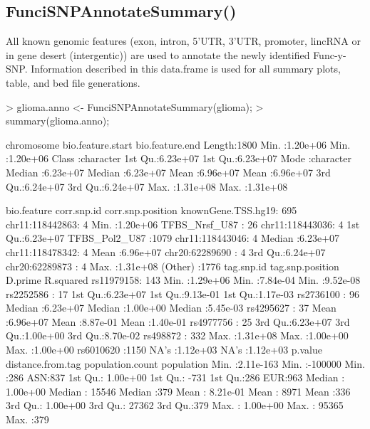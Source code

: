 \documentclass[a4paper]{article}
\begin{document}
\subsection*{FunciSNPAnnotateSummary()}
All known genomic features (exon, intron, 5'UTR, 3'UTR, promoter, lincRNA or in 
gene desert (intergentic)) are used to annotate the newly identified Func-y-SNP.
 Information described in this data.frame is used for all summary plots, table, 
 and bed file generations.
\begin{Schunk}
\begin{Sinput}
> glioma.anno <- FunciSNPAnnotateSummary(glioma);
> summary(glioma.anno);
\end{Sinput}
\begin{Soutput}
  chromosome        bio.feature.start  bio.feature.end   
 Length:1800        Min.   :1.20e+06   Min.   :1.20e+06  
 Class :character   1st Qu.:6.23e+07   1st Qu.:6.23e+07  
 Mode  :character   Median :6.23e+07   Median :6.23e+07  
                    Mean   :6.96e+07   Mean   :6.96e+07  
                    3rd Qu.:6.24e+07   3rd Qu.:6.24e+07  
                    Max.   :1.31e+08   Max.   :1.31e+08  
                                                         
             bio.feature            corr.snp.id   corr.snp.position 
 knownGene.TSS.hg19: 695   chr11:118442863:   4   Min.   :1.20e+06  
 TFBS_Nrsf_U87     :  26   chr11:118443036:   4   1st Qu.:6.23e+07  
 TFBS_Pol2_U87     :1079   chr11:118443046:   4   Median :6.23e+07  
                           chr11:118478342:   4   Mean   :6.96e+07  
                           chr20:62289690 :   4   3rd Qu.:6.24e+07  
                           chr20:62289873 :   4   Max.   :1.31e+08  
                           (Other)        :1776                     
      tag.snp.id   tag.snp.position      D.prime           R.squared       
 rs11979158: 143   Min.   :1.29e+06   Min.   :7.84e-04   Min.   :9.52e-08  
 rs2252586 :  17   1st Qu.:6.23e+07   1st Qu.:9.13e-01   1st Qu.:1.17e-03  
 rs2736100 :  96   Median :6.23e+07   Median :1.00e+00   Median :5.45e-03  
 rs4295627 :  37   Mean   :6.96e+07   Mean   :8.87e-01   Mean   :1.40e-01  
 rs4977756 :  25   3rd Qu.:6.23e+07   3rd Qu.:1.00e+00   3rd Qu.:8.70e-02  
 rs498872  : 332   Max.   :1.31e+08   Max.   :1.00e+00   Max.   :1.00e+00  
 rs6010620 :1150                      NA's   :1.12e+03   NA's   :1.12e+03  
    p.value          distance.from.tag population.count population
 Min.   :2.11e-163   Min.   :-100000   Min.   :286      ASN:837   
 1st Qu.: 1.00e+00   1st Qu.:   -731   1st Qu.:286      EUR:963   
 Median : 1.00e+00   Median :  15546   Median :379                
 Mean   : 8.21e-01   Mean   :   8971   Mean   :336                
 3rd Qu.: 1.00e+00   3rd Qu.:  27362   3rd Qu.:379                
 Max.   : 1.00e+00   Max.   :  95365   Max.   :379                
                                                                  

\end{Soutput}
\end{Schunk}
\end{document}

